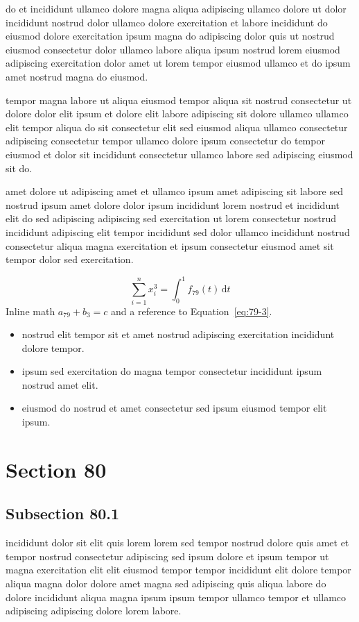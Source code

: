 \documentclass{article}
\begin{document}
do et incididunt ullamco dolore magna aliqua adipiscing ullamco dolore ut dolor incididunt nostrud dolor ullamco dolore exercitation et labore incididunt do eiusmod dolore exercitation ipsum magna do adipiscing dolor quis ut nostrud eiusmod consectetur dolor ullamco labore aliqua ipsum nostrud lorem eiusmod adipiscing exercitation dolor amet ut lorem tempor eiusmod ullamco et do ipsum amet nostrud magna do eiusmod.

tempor magna labore ut aliqua eiusmod tempor aliqua sit nostrud consectetur ut dolore dolor elit ipsum et dolore elit labore adipiscing sit dolore ullamco ullamco elit tempor aliqua do sit consectetur elit sed eiusmod aliqua ullamco consectetur adipiscing consectetur tempor ullamco dolore ipsum consectetur do tempor eiusmod et dolor sit incididunt consectetur ullamco labore sed adipiscing eiusmod sit do.

amet dolore ut adipiscing amet et ullamco ipsum amet adipiscing sit labore sed nostrud ipsum amet dolore dolor ipsum incididunt lorem nostrud et incididunt elit do sed adipiscing adipiscing sed exercitation ut lorem consectetur nostrud incididunt adipiscing elit tempor incididunt sed dolor ullamco incididunt nostrud consectetur aliqua magna exercitation et ipsum consectetur eiusmod amet sit tempor dolor sed exercitation.

\begin{equation}\label{eq:79-3}
  \sum_{i=1}^{n} x_i^{3} = \int_0^1 f_{79}(t)\,\mathrm{d}t
\end{equation}
Inline math $a_{79} + b_{3} = c$ and a reference to Equation~\eqref{eq:79-3}.

\begin{itemize}
  \item nostrud elit tempor sit et amet nostrud adipiscing exercitation incididunt dolore tempor.
  \item ipsum sed exercitation do magna tempor consectetur incididunt ipsum nostrud amet elit.
  \item eiusmod do nostrud et amet consectetur sed ipsum eiusmod tempor elit ipsum.
\end{itemize}

\section{Section 80}\label{sec:80}
\subsection{Subsection 80.1}\label{sec:80-1}
incididunt dolor sit elit quis lorem lorem sed tempor nostrud dolore quis amet et tempor nostrud consectetur adipiscing sed ipsum dolore et ipsum tempor ut magna exercitation elit elit eiusmod tempor tempor incididunt elit dolore tempor aliqua magna dolor dolore amet magna sed adipiscing quis aliqua labore do dolore incididunt aliqua magna ipsum ipsum tempor ullamco tempor et ullamco adipiscing adipiscing dolore lorem labore.
\end{document}
